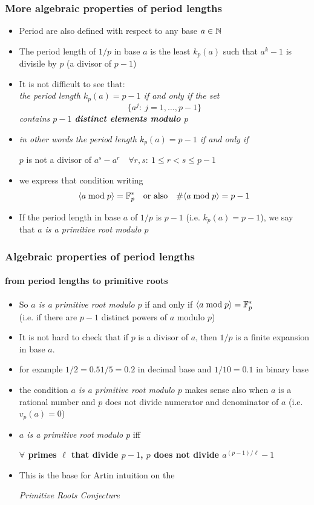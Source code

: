 \documentclass[10pt,handout]{beamer} %
\begin{document}
\begin{frame}
 \frametitle{More algebraic properties of period lengths}
\begin{itemize}[<+-|alert@+>]
\item Period are also defined with respect to any base $a\in\mathbb N$
\item The period length of $1/p$ in base $a$ is the least $k_p(a)$ such that $a^k-1$ is divisile by $p$ (a divisor of $p-1$)
\item It is not difficult to see that:\\
\emph{ the period length $k_p(a)=p-1$ if and only if the set
$$\{a^j:\ j=1,\ldots,p-1\}$$
contains $p-1$ \textbf{distinct elements modulo $p$}}
\item \emph{in other words the period length $k_p(a)=p-1$ if and only if}\medskip

\centerline{$p$ is not a divisor of $a^s-a^r\quad\forall r,s:\ 1\le r<s\le p-1$}
\item we express that condition writing 
$$\langle a\bmod p\rangle=\mathbb F_p^*\quad\text{or also}\quad\#\langle a\bmod p\rangle=p-1$$
\item If the period length in base $a$ of $1/p$ is $p-1$ (i.e. $k_p(a)=p-1$), we say that \emph{$a$ is a primitive root modulo $p$}

\end{itemize}
\end{frame}


\begin{frame}
  \frametitle{Algebraic properties of period lengths}
\framesubtitle{from period lengths to primitive roots}

\begin{itemize}[<+-|alert@+>]
\item So \emph{$a$ is a primitive root modulo $p$} if and only if $\langle a\bmod p\rangle=\mathbb F_p^*$\\  (i.e.
if there are $p-1$ distinct powers of $a$ modulo $p$)
\item It is not hard to check that if $p$ is a divisor of $a$, then $1/p$ is a finite expansion in base $a$.
\item for example $1/2=0.5$\quad $1/5=0.2$ in decimal base and $1/10=0.1$ in binary base
\item the condition \emph{$a$ is a primitive root modulo $p$} makes sense also when $a$ is a rational
number and $p$ does not divide numerator and denominator of $a$ (i.e. $v_p(a)=0$)
\item \emph{$a$ is a primitive root modulo $p$} iff \medskip

\textbf{$\!\!\!\!\!\!\!\!\forall$ primes $\ell$ that divide $p-1$,
$p$ does not divide $a^{(p-1)/\ell}-1$} 
\item This is the base for Artin intuition on the\medskip

\centerline{ \emph{Primitive Roots Conjecture}}
\end{itemize}
\end{frame}
\end{document}
